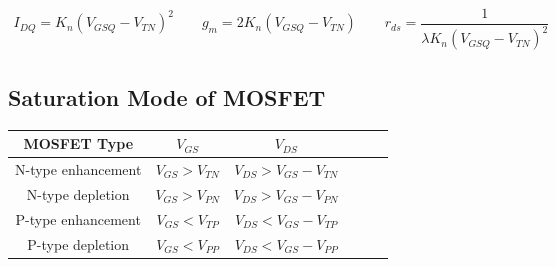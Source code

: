 \begin{equation*}
  \begin{aligned}
    I_{DQ} = K_n \left( V_{GSQ} - V_{TN} \right)^2 \quad\quad
    g_m = 2 K_n \left( V_{GSQ} - V_{TN} \right) \quad\quad
    r_{ds} = \dfrac{1}{\lambda K_n \left( V_{GSQ} - V_{TN} \right)^2} 
  \end{aligned}
\end{equation*}

\subsection{Saturation Mode of MOSFET}

\begin{table}[htbp]
  \centering
  \begin{tabular}{|Sc|Sc|Sc|}
    \hline
    MOSFET Type & $V_{GS}$ & $V_{DS}$ \\
    \hline
    N-type enhancement & $V_{GS} > V_{TN}$ & $V_{DS} > V_{GS} - V_{TN}$ \\
    \hline
    N-type depletion & $V_{GS} > V_{PN}$ & $V_{DS} > V_{GS} - V_{PN}$ \\
    \hline
    P-type enhancement & $V_{GS} < V_{TP}$ & $V_{DS} < V_{GS} - V_{TP}$ \\
    \hline
    P-type depletion & $V_{GS} < V_{PP}$ & $V_{DS} < V_{GS} - V_{PP}$ \\
    \hline
  \end{tabular}
\end{table}

